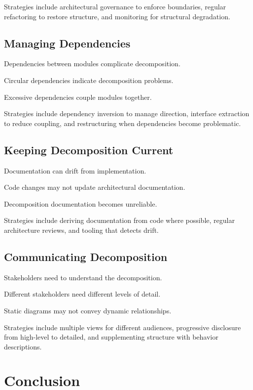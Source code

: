 \documentclass[11pt]{article}
\begin{document}
Strategies include architectural governance to enforce boundaries, regular refactoring to restore structure, and monitoring for structural degradation.

\subsection{Managing Dependencies}

Dependencies between modules complicate decomposition.

Circular dependencies indicate decomposition problems.

Excessive dependencies couple modules together.

Strategies include dependency inversion to manage direction, interface extraction to reduce coupling, and restructuring when dependencies become problematic.

\subsection{Keeping Decomposition Current}

Documentation can drift from implementation.

Code changes may not update architectural documentation.

Decomposition documentation becomes unreliable.

Strategies include deriving documentation from code where possible, regular architecture reviews, and tooling that detects drift.

\subsection{Communicating Decomposition}

Stakeholders need to understand the decomposition.

Different stakeholders need different levels of detail.

Static diagrams may not convey dynamic relationships.

Strategies include multiple views for different audiences, progressive disclosure from high-level to detailed, and supplementing structure with behavior descriptions.

\section{Conclusion}
\end{document}
